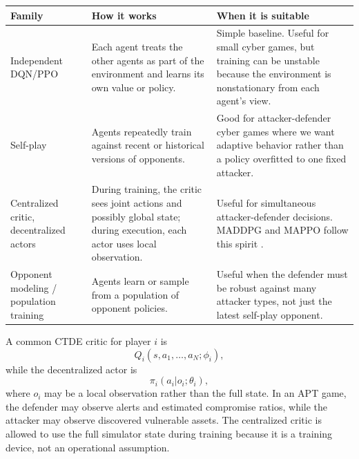 \documentclass[11pt,a4paper]{article}
\begin{document}
\begin{longtable}{p{}p{}p{}}
\toprule
Family & How it works & When it is suitable \\
\midrule
Independent DQN/PPO & Each agent treats the other agents as part of the environment and learns its own value or policy. & Simple baseline. Useful for small cyber games, but training can be unstable because the environment is nonstationary from each agent's view. \\
Self-play & Agents repeatedly train against recent or historical versions of opponents. & Good for attacker-defender cyber games where we want adaptive behavior rather than a policy overfitted to one fixed attacker. \\
Centralized critic, decentralized actors & During training, the critic sees joint actions and possibly global state; during execution, each actor uses local observation. & Useful for simultaneous attacker-defender decisions. MADDPG and MAPPO follow this spirit \cite{lowe2017,yu2021mappo}. \\
Opponent modeling / population training & Agents learn or sample from a population of opponent policies. & Useful when the defender must be robust against many attacker types, not just the latest self-play opponent. \\
\bottomrule
\end{longtable}

A common CTDE critic for player $i$ is
\begin{equation}
Q_i(s,a_1,\ldots,a_N;\phi_i),
\end{equation}
while the decentralized actor is
\begin{equation}
\pi_i(a_i|o_i;\theta_i),
\end{equation}
where $o_i$ may be a local observation rather than the full state. In an APT game, the defender may observe alerts and estimated compromise ratios, while the attacker may observe discovered vulnerable assets. The centralized critic is allowed to use the full simulator state during training because it is a training device, not an operational assumption.
\end{document}
